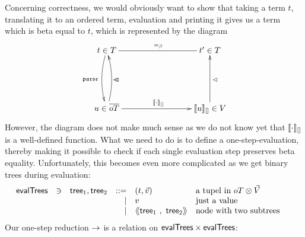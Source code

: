 \documentclass[submission,copyright,creativecommons]{eptcs}
\begin{document}
%

Concerning correctness, we would obviously want to show that taking a term $t$, translating it to an ordered term, evaluation and printing it gives us a term which is beta equal to $t$, which is represented by the diagram
\[
\begin{xy}
\xymatrix{
 t \in \te \ar@{-}[rrr]^{=_\beta} \ar@/_/[dd]_{\parseFunE} & & & t' \in \te \\ 
 \\
 u \in \otc \ar@/_/[uu]_{\prE                  } \ar[rrr]^{\ev{\cdot}{\emptyVec}} & & & \ev{u}{\emptyVec} \in \va \ar[uu]_{\prValE}
}
\end{xy}
\]
However, the diagram does not make much sense as we do not know yet that $\llbracket{\cdot}\rrbracket_{[]}$ is a well-defined function.
What we need to do is to define a one-step-evaluation, thereby making it possible to check if each single evaluation step preserves beta equality. Unfortunately, this becomes even more complicated as we get binary trees during evaluation: 
\[
\begin{array}{lllrll@{\qquad}}
\evTr       & \ni & \mathsf{tree}_1, \mathsf{tree}_2 & ::= & (t, \vec v) & \mbox{a tupel in $\ot \otimes \vl$} \\
			                   &&& \mid & v & \mbox{just a value} \\
			                   &&& \mid & \tree {\mathsf{tree}_1} {\mathsf{tree}_2}  & \mbox{node with two subtrees} 
\end{array}
\]
Our one-step reduction $\rightarrow$ is a relation on $\mathsf{evalTrees} \times \mathsf{evalTrees}$:
\end{document}
